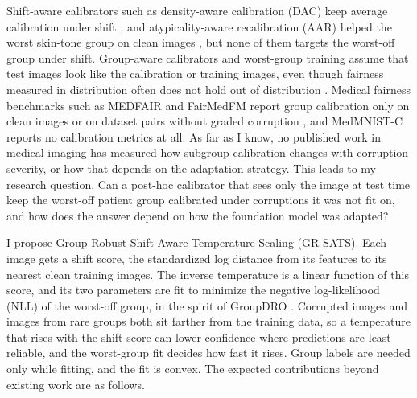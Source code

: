 \documentclass[sigconf,nonacm]{acmart}
\begin{document}
Shift-aware calibrators such as density-aware calibration (DAC) keep average calibration under shift \cite{tomani2021posthoc,yu2022multidomain,tomani2023dac}, and atypicality-aware recalibration (AAR) helped the worst skin-tone group on clean images \cite{yuksekgonul2023atypicality}, but none of them targets the worst-off group under shift. Group-aware calibrators \cite{hebertjohnson2018multicalibration,salvador2022faircal} and worst-group training \cite{sagawa2020groupdro,shui2023clusterfocal} assume that test images look like the calibration or training images, even though fairness measured in distribution often does not hold out of distribution \cite{schrouff2022diagnosing,yang2024limits}. Medical fairness benchmarks such as MEDFAIR and FairMedFM report group calibration only on clean images or on dataset pairs without graded corruption \cite{zong2023medfair,jin2024fairmedfm}, and MedMNIST-C \cite{disalvo2024medmnistc} reports no calibration metrics at all. As far as I know, no published work in medical imaging has measured how subgroup calibration changes with corruption severity, or how that depends on the adaptation strategy. This leads to my research question. Can a post-hoc calibrator that sees only the image at test time keep the worst-off patient group calibrated under corruptions it was not fit on, and how does the answer depend on how the foundation model was adapted?

I propose Group-Robust Shift-Aware Temperature Scaling (GR-SATS). Each image gets a shift score, the standardized log distance from its features to its nearest clean training images. The inverse temperature is a linear function of this score, and its two parameters are fit to minimize the negative log-likelihood (NLL) of the worst-off group, in the spirit of GroupDRO \cite{sagawa2020groupdro}. Corrupted images and images from rare groups both sit farther from the training data, so a temperature that rises with the shift score can lower confidence where predictions are least reliable, and the worst-group fit decides how fast it rises. Group labels are needed only while fitting, and the fit is convex. The expected contributions beyond existing work are as follows.
\end{document}

